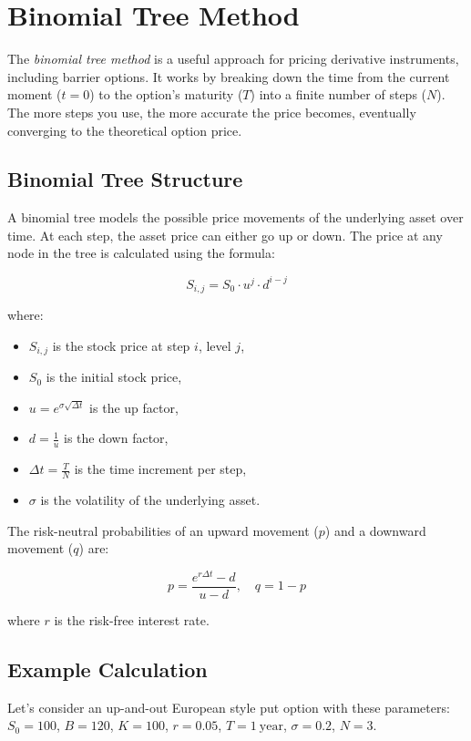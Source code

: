 \chapter{Binomial Tree Method}
\label{sec:binomial-tree}

The \textit{binomial tree method} is a useful approach for pricing derivative instruments, including barrier options. It works by breaking down the time from the current moment (\(t = 0\)) to the option's maturity (\(T\)) into a finite number of steps (\(N\)). The more steps you use, the more accurate the price becomes, eventually converging to the theoretical option price.

\section{Binomial Tree Structure}

A binomial tree models the possible price movements of the underlying asset over time. At each step, the asset price can either go up or down. The price at any node in the tree is calculated using the formula:

\[
S_{i,j} = S_0 \cdot u^j \cdot d^{i-j}
\]

where:
\begin{itemize}
    \item \(S_{i,j}\) is the stock price at step \(i\), level \(j\),
    \item \(S_0\) is the initial stock price,
    \item \(u = e^{\sigma \sqrt{\Delta t}}\) is the up factor,
    \item \(d = \frac{1}{u}\) is the down factor,
    \item \(\Delta t = \frac{T}{N}\) is the time increment per step,
    \item \(\sigma\) is the volatility of the underlying asset.
\end{itemize}

The risk-neutral probabilities of an upward movement (\(p\)) and a downward movement (\(q\)) are:

\[
p = \frac{e^{r \Delta t} - d}{u - d}, \quad q = 1 - p
\]

where \(r\) is the risk-free interest rate.

\section{Example Calculation}

Let's consider an up-and-out European style put option with these parameters:
\(S_0 = 100\), \(B = 120\), \(K = 100\), \(r = 0.05\), \(T = 1\ \text{year}\), \(\sigma = 0.2\), \(N = 3\).

